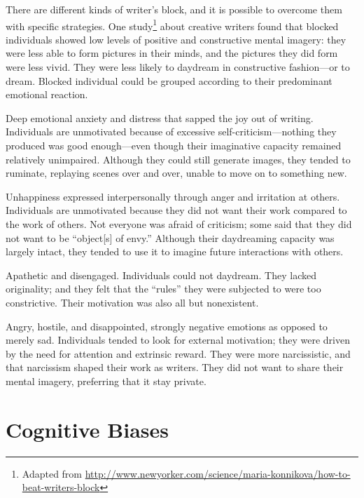 \documentclass[12pt]{article}
\begin{document}
There are different kinds of writer's block, and it is possible to overcome them with specific strategies.
One study\footnote{Adapted from \url{http://www.newyorker.com/science/maria-konnikova/how-to-beat-writers-block}} about creative writers found that blocked individuals showed low levels of positive and constructive mental imagery: they were less able to form pictures in their minds, and the pictures they did form were less vivid.
They were less likely to daydream in constructive fashion—or to dream.
Blocked individual could be grouped according to their predominant emotional reaction.
\begin{compactitem}
\item Deep emotional anxiety and distress that sapped the joy out of writing.
 Individuals are unmotivated because of excessive self-criticism---nothing they produced was good enough---even though their imaginative capacity remained relatively unimpaired. Although they could still generate images, they tended to ruminate, replaying scenes over and over, unable to move on to something new.
\item Unhappiness expressed interpersonally through anger and irritation at others.
  Individuals are unmotivated because they did not want their work compared to the work of others.
  Not everyone was afraid of criticism; some said that they did not want to be ``object[s] of envy.''
  Although their daydreaming capacity was largely intact, they tended to use it to imagine future interactions with others. 
\item Apathetic and disengaged. Individuals could not daydream.
 They lacked originality; and they felt that the ``rules'' they were subjected to were too constrictive.
 Their motivation was also all but nonexistent. 
\item Angry, hostile, and disappointed, strongly negative emotions as opposed to merely sad.
  Individuals tended to look for external motivation; they were driven by the need for attention and extrinsic reward.
  They were more narcissistic, and that narcissism shaped their work as writers.
  They did not want to share their mental imagery, preferring that it stay private.
\end{compactitem}

\section{Cognitive Biases}
\end{document}
